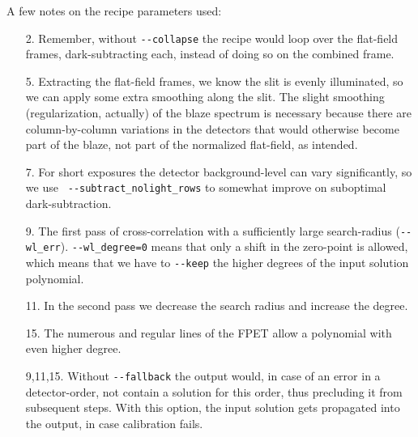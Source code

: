 A few notes on the recipe parameters used:
\begin{enumerate}
  \item[2.] Remember, without \verb!--collapse! the recipe would loop over the
  flat-field frames, dark-subtracting each, instead of doing so on the combined
  frame.
  \item[5.] Extracting the flat-field frames, we know the slit is evenly
  illuminated, so we can apply some extra smoothing along the slit. The slight
  smoothing (regularization, actually) of the blaze spectrum is necessary
  because there are column-by-column variations in the detectors that would
  otherwise become part of the blaze, not part of the normalized flat-field, as
  intended.
  \item[7.] For short exposures the detector background-level can vary
  significantly, so we use \linebreak \verb! --subtract_nolight_rows! to somewhat improve
  on suboptimal dark-subtraction.
  \item[9.] The first pass of cross-correlation with a sufficiently large
  search-radius (\verb!--wl_err!). \verb!--wl_degree=0! means that only a shift
  in the zero-point is allowed, which means that we have to \verb!--keep! the
  higher degrees of the input solution polynomial.
  \item[11.] In the second pass we decrease the search radius and increase the
  degree.
  \item[15.] The numerous and regular lines of the FPET allow a polynomial with
  even higher degree.
  \item[9,11,15.] Without \verb!--fallback! the output would, in case of an
  error in a detector-order, not contain a solution for this order, thus
  precluding it from subsequent steps. With this option, the input solution gets
  propagated into the output, in case calibration fails.
\end{enumerate}
